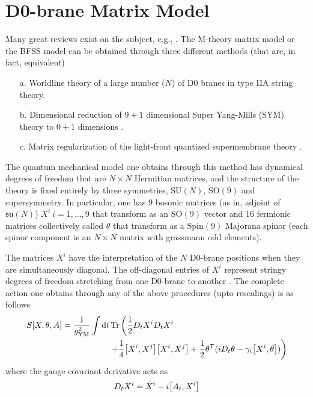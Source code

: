 \section{D0-brane Matrix Model}

Many great reviews exist on the subject, e.g., \cite{Taylor:2001vb,Bilal:1997fy,Ydri:2017ncg}. The M-theory matrix model or the BFSS model can be obtained through three different methods (that are, in fact, equivalent)
\begin{enumerate}
    \item[a.] Worldline theory of a large number ($N$) of D0 branes in type IIA string theory. \cite{Itzhaki:1998dd}
    \item[b.] Dimensional reduction of $9+1$ dimensional Super Yang-Mills (SYM) theory to $0+1$ dimensions \cite{Claudson:1984th}.
    \item[c.] Matrix regularization of the light-front quantized supermembrane theory \cite{deWit:1988wri}.
\end{enumerate}

The quantum mechanical model one obtains through this method has dynamical degrees of freedom that are $N \times N$ Hermitian matrices, and the structure of the theory is fixed entirely by three symmetries, $\mathrm{SU}(N)$, $\mathrm{SO}(9)$ and supersymmetry. In particular, one has $9$ bosonic matrices (as in, adjoint of $\mathfrak{su}(N)$) $X^i \ i=1,\ldots,9$ that transform as an $\mathrm{SO}(9)$ vector and $16$ fermionic matrices collectively called $\theta$ that transform as a $\mathrm{Spin}(9)$ Majorana spinor (each spinor component is an $N \times N$ matrix with grassmann odd elements). 

The matrices $X^i$ have the interpretation of the $N$ D0-brane positions when they are simultaneously diagonal. The off-diagonal entries of $X^i$ represent stringy degrees of freedom stretching from one D0-brane to another \cite{Polchinski:1996na}. The complete action one obtains through any of the above procedures (upto rescalings) is as follows
\begin{align}
    \begin{split}
    S[X, \theta, A] = \frac{1}{g_\mathrm{YM}^2} \int \text{d}t & \Tr \left( \frac{1}{2} D_{t}X^{i} D_{t}X^{i} \right. \\ 
    & \left. + \frac{1}{4} \comm{X^i}{X^j}\comm{X^i}{X^j} + \frac{1}{2} \theta^T (i D_t{\theta} - \gamma_i \comm{X^i}{\theta}) \right)
    \end{split} 
\end{align}
where the gauge covariant derivative acts as
\begin{equation}
    D_t X^i = \dot{X}^i - i \comm{A_t}{X^i}
\end{equation}

